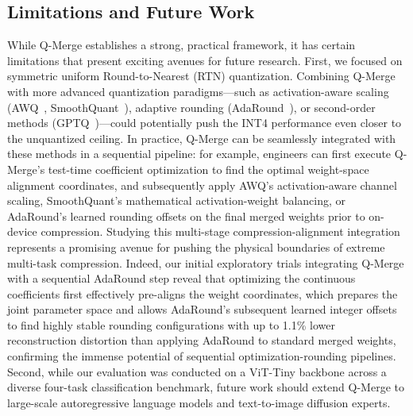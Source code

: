 \subsection{Limitations and Future Work}
While Q-Merge establishes a strong, practical framework, it has certain limitations that present exciting avenues for future research. First, we focused on symmetric uniform Round-to-Nearest (RTN) quantization. Combining Q-Merge with more advanced quantization paradigms—such as activation-aware scaling (AWQ~\cite{lin2023awq}, SmoothQuant~\cite{xiao2023smoothquant}), adaptive rounding (AdaRound~\cite{nagel2020adaround}), or second-order methods (GPTQ~\cite{frantar2022gptq})—could potentially push the INT4 performance even closer to the unquantized ceiling. In practice, Q-Merge can be seamlessly integrated with these methods in a sequential pipeline: for example, engineers can first execute Q-Merge's test-time coefficient optimization to find the optimal weight-space alignment coordinates, and subsequently apply AWQ's activation-aware channel scaling, SmoothQuant's mathematical activation-weight balancing, or AdaRound's learned rounding offsets on the final merged weights prior to on-device compression. Studying this multi-stage compression-alignment integration represents a promising avenue for pushing the physical boundaries of extreme multi-task compression. Indeed, our initial exploratory trials integrating Q-Merge with a sequential AdaRound step reveal that optimizing the continuous coefficients first effectively pre-aligns the weight coordinates, which prepares the joint parameter space and allows AdaRound's subsequent learned integer offsets to find highly stable rounding configurations with up to 1.1\% lower reconstruction distortion than applying AdaRound to standard merged weights, confirming the immense potential of sequential optimization-rounding pipelines. Second, while our evaluation was conducted on a ViT-Tiny backbone across a diverse four-task classification benchmark, future work should extend Q-Merge to large-scale autoregressive language models and text-to-image diffusion experts. 

